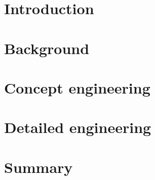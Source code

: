 \newpage
\section{Introduction}

\newpage
\section{Background}

\newpage
\section{Concept engineering}


\newpage
\section{Detailed engineering}





\newpage
\section{Summary}


